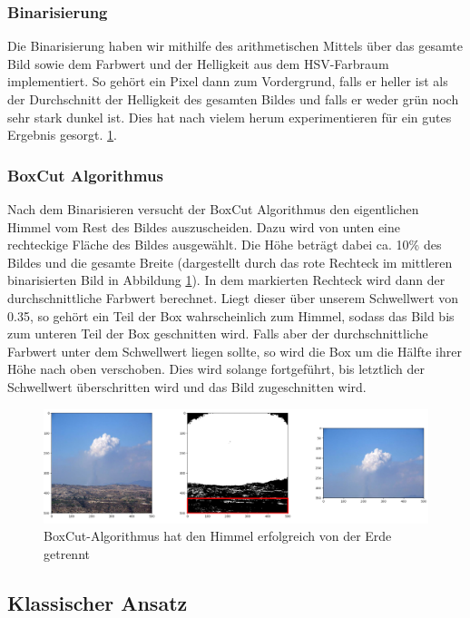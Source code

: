 \documentclass[a4,german]{article}
\begin{document}
\subsubsection{Binarisierung} 
\label{sec:binary}
Die Binarisierung haben wir mithilfe des arithmetischen Mittels über das gesamte Bild sowie dem Farbwert und der Helligkeit aus dem HSV-Farbraum implementiert.
So gehört  ein Pixel dann zum Vordergrund, falls er heller ist als der Durchschnitt der Helligkeit des gesamten Bildes und falls er weder grün noch sehr stark dunkel ist.
Dies hat nach vielem herum experimentieren für ein gutes Ergebnis gesorgt. \ref{fig:boxAlg}.

\subsubsection{BoxCut Algorithmus}
\label{sec:boxcut}
Nach dem Binarisieren versucht der BoxCut Algorithmus den eigentlichen Himmel vom Rest des Bildes auszuscheiden. Dazu wird von unten eine rechteckige Fläche des Bildes ausgewählt. Die Höhe beträgt dabei ca. 10\%
des Bildes und die gesamte Breite (dargestellt durch das rote Rechteck im mittleren binarisierten Bild in Abbildung \ref{fig:boxAlg}). In dem markierten Rechteck wird dann der durchschnittliche Farbwert berechnet.
Liegt dieser über unserem Schwellwert von 0.35, so gehört ein Teil der Box wahrscheinlich zum Himmel, sodass das Bild bis zum unteren Teil der Box geschnitten wird.
Falls aber der durchschnittliche Farbwert unter dem Schwellwert liegen sollte, so wird die Box um die Hälfte ihrer Höhe nach oben verschoben. Dies wird solange fortgeführt, bis letztlich der Schwellwert überschritten wird und das Bild zugeschnitten wird.


\begin{figure}[h!]
\centering
\includegraphics[width=1.1\textwidth]{boxAlg}
\caption{BoxCut-Algorithmus hat den Himmel erfolgreich von der Erde getrennt}
\label{fig:boxAlg}
\end{figure}


\subsection{Klassischer Ansatz}
\end{document}
